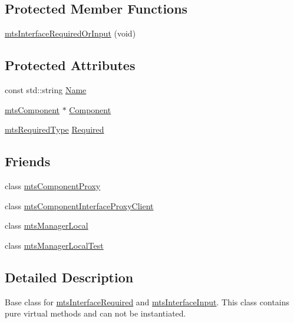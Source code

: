 \subsection*{Protected Member Functions}
\begin{DoxyCompactItemize}
\item 
\hyperlink{classmts_interface_required_or_input_a032937ad6ca36250fe619745c7da4589}{mts\-Interface\-Required\-Or\-Input} (void)
\end{DoxyCompactItemize}
\subsection*{Protected Attributes}
\begin{DoxyCompactItemize}
\item 
const std\-::string \hyperlink{classmts_interface_required_or_input_aeaaf350b344d0b697b19c6f642b67317}{Name}
\item 
\hyperlink{classmts_component}{mts\-Component} $\ast$ \hyperlink{classmts_interface_required_or_input_a671dde64d1580dde3b87a8fc97ac9462}{Component}
\item 
\hyperlink{mts_forward_declarations_8h_a9ef1ce54724afde7802db326ff8606f3}{mts\-Required\-Type} \hyperlink{classmts_interface_required_or_input_ac0ae074f8fe197420257c16e1f0f7db2}{Required}
\end{DoxyCompactItemize}
\subsection*{Friends}
\begin{DoxyCompactItemize}
\item 
class \hyperlink{classmts_interface_required_or_input_a744ae66bbeeeba6ef38e59a2dd5e9743}{mts\-Component\-Proxy}
\item 
class \hyperlink{classmts_interface_required_or_input_a18fd56a8a436d449d0b4cfd44835f821}{mts\-Component\-Interface\-Proxy\-Client}
\item 
class \hyperlink{classmts_interface_required_or_input_a31c1c611dbb103ac58ed40d84960baa0}{mts\-Manager\-Local}
\item 
class \hyperlink{classmts_interface_required_or_input_adc2ae8db48d5418c526f275aafa3d4a9}{mts\-Manager\-Local\-Test}
\end{DoxyCompactItemize}


\subsection{Detailed Description}
Base class for \hyperlink{classmts_interface_required}{mts\-Interface\-Required} and \hyperlink{classmts_interface_input}{mts\-Interface\-Input}. This class contains pure virtual methods and can not be instantiated. 

